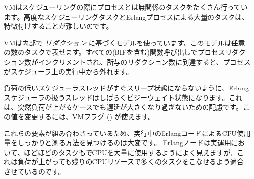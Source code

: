\begin{itemize*}
  \item VMはスケジューリングの際にプロセスとは無関係のタスクをたくさん行っています。高度なスケジューリングタスクとErlangプロセスによる大量のタスクは、特徴付けすることが難しいのです。 
  \item VMは内部で \emph{リダクション} に基づくモデルを使っています。このモデルは任意の数のタスクで表せます。すべての(BIFを含む)関数呼び出しでプロセスリダクション数がインクリメントされ、所与のリダクション数に到達すると、プロセスがスケジューラ上の実行中から外れます。
  \item 負荷の低いスケジューラスレッドがすぐスリープ状態にならないように、Erlangスケジューラの扱うスレッドはしばらくビジーウェイト状態になります。これは、突然負荷が上がるケースでも遅延が大きくなり過ぎないための配慮です。この値を変更するには、VMフラグ () が使えます。 
\end{itemize*}

これらの要素が組み合わさっているため、実行中のErlangコードによるCPU使用量をしっかりと測る方法を見つけるのは大変です。
Erlangノードは実運用において、ほどほどのタスクもでCPUを大量に使用するようによく見えますが、これは負荷が上がっても残りのCPUリソースで多くのタスクをこなせるよう適合させているのです。 

